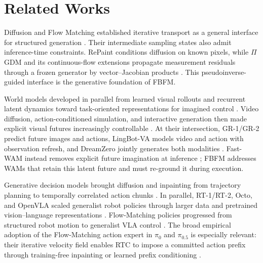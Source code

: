 
\section{Related Works}
\label{sec:related-works}

Diffusion and Flow Matching established iterative transport as a general
interface for structured generation
\cite{sohl2015deep,ho2020denoising,song2021ddim,song2021score,rombach2022latent,
lipman2023flow,liu2023rectified}. Their intermediate sampling states also admit
inference-time constraints. RePaint conditions diffusion on known pixels, while
$\Pi$GDM and its continuous-flow extensions propagate measurement residuals
through a frozen generator by vector--Jacobian products
\cite{lugmayr2022repaint,song2023pseudoinverse,pokle2024training}. This
pseudoinverse-guided interface is the generative foundation of FBFM.

World models developed in parallel from learned visual rollouts and recurrent
latent dynamics toward task-oriented representations for imagined control
\cite{ha2018world,kaiser2020simple,hafner2019planet,hafner2020dreamer,
hafner2021dreamerv2,schrittwieser2020muzero,hansen2022tdmpc,hafner2025dreamerv3}.
Video diffusion, action-conditioned simulation, and interactive generation then
made explicit visual futures increasingly controllable
\cite{voleti2022mcvd,yang2024unisim,bruce2024genie,alonso2024diamond,zhu2025irasim}.
At their intersection, GR-1/GR-2 predict future images and actions, LingBot-VA
models video and action with observation refresh, and DreamZero jointly generates
both modalities \cite{wu2023gr1,cheang2024gr2,li2026lingbot,ye2026dreamzero}.
Fast-WAM instead removes explicit future imagination at inference
\cite{yuan2026fastwam}; FBFM addresses WAMs that retain this latent future and
must re-ground it during execution.

Generative decision models brought diffusion and inpainting from trajectory
planning to temporally correlated action chunks
\cite{janner2022diffuser,ajay2023decisiondiffuser,zhao2023act,
chi2023diffusionpolicy,ze2024dp3,liu2025rdt}. In parallel, RT-1/RT-2, Octo, and
OpenVLA scaled generalist robot policies through larger data and pretrained
vision--language representations
\cite{brohan2023rt1,brohan2023rt2,octo2024,kim2024openvla}. Flow-Matching
policies progressed from structured robot motion to generalist VLA control
\cite{braun2024rfmp,rouxel2024multisupport,zhang2025affordance}. The broad
empirical adoption of the Flow-Matching action expert in $\pi_0$ and
$\pi_{0.5}$ \cite{black2024pi0,pi2025pi05} is especially relevant: their
iterative velocity field enables RTC to impose a committed action prefix through
training-free inpainting or learned prefix conditioning
\cite{black2025realtime,black2025training}.

